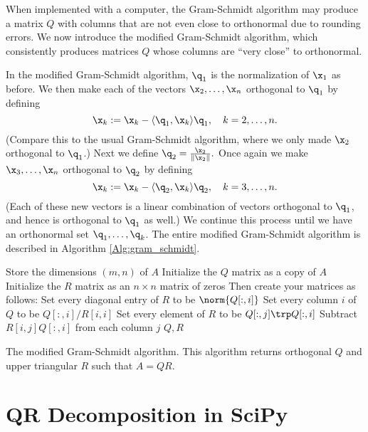 When implemented with a computer, the Gram-Schmidt algorithm may produce a matrix $Q$ with columns that are not even close to orthonormal due to rounding errors.
We now introduce the modified Gram-Schmidt algorithm, which consistently produces matrices $Q$ whose columns are ``very close'' to orthonormal.

In the modified Gram-Schmidt algorithm, $\q_1$ is the normalization of $\x_1$ as before.
We then make each of the vectors $\x_2, \ldots, \x_n$ orthogonal to $\q_1$ by defining
\[
\x_k := \x_k - \langle \q_1,\x_{k} \rangle \q_1,\quad k=2,\ldots,n.
\]
(Compare this to the usual Gram-Schmidt algorithm, where we only made $\x_2$ orthogonal to $\q_1$.)
Next we define $\q_2 = \frac{\x_2}{\|\x_2\|}.$ Once again we make $\x_3, \ldots, \x_n$ orthogonal to $\q_2$ by defining
\[
\x_k := \x_k - \langle \q_2,\x_{k} \rangle \q_2,\quad k=3,\ldots,n.
\]
(Each of these new vectors is a linear combination of vectors orthogonal to $\q_1$, and hence is orthogonal to $\q_1$ as well.)
We continue this process until we have an orthonormal set $\q_1, \ldots, \q_k$.
The entire modified Gram-Schmidt algorithm is described in Algorithm \ref{Alg:gram_schmidt}.

\begin{algorithm}
\begin{algorithmic}[1]
\State Store the dimensions $(m,n)$ of $A$
\State Initialize the $Q$ matrix as a copy of $A$
\State Initialize the $R$ matrix as an $n\times n$ matrix of zeros
\State Then create your matrices as follows:
    \State Set every diagonal entry of $R$ to be $\norm{Q[:,i]}$
    \State Set every column $i$ of $Q$ to be $ Q[:,i]/R[i,i]$
        \State Set every element of $R$ to be $Q[:,j]\trp  Q[:,i]$
        \State Subtract $R[i,j]Q[:,i]$ from each column $j$
	\EndFor
\EndFor
\State {} $Q, R$
\EndProcedure
\end{algorithmic}
\caption{The modified Gram-Schmidt algorithm. This algorithm returns orthogonal $Q$ and upper triangular $R$ such that $A = QR$.}
\label{Alg:gram_schmidt}
\end{algorithm}


\section*{QR Decomposition in SciPy} %

